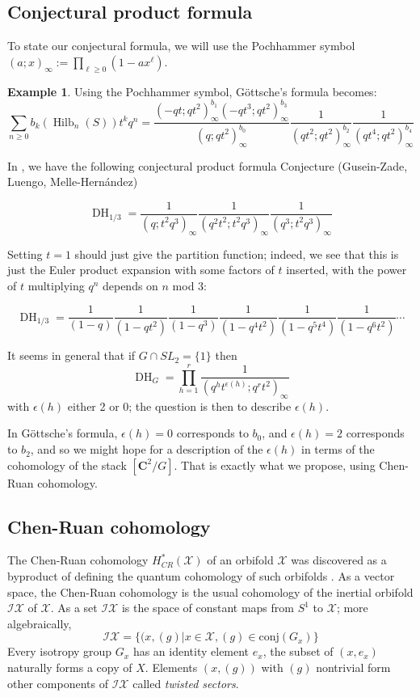 \documentclass{amsart}[12pt]
\theoremstyle{definition}
\newtheorem{example}[dummy]{Example}
\newcommand{\C}{\mathbf{C}}
\DeclareMathOperator{\Hilb}{Hilb}
\DeclareMathOperator{\DC}{DH}
\begin{document}
\subsection{Conjectural product formula}

To state our conjectural formula, we will use the Pochhammer symbol $(a;x)_\infty:=\prod_{\ell\geq 0} (1-ax^\ell)$.
\begin{example}
Using the Pochhammer symbol, G\"ottsche's formula becomes:
$$\sum_{n\geq 0} b_k(\Hilb_n(S))t^kq^n=\frac{(-qt;qt^2)_\infty^{b_1}(-qt^3;qt^2)_\infty^{b_3}}{(q;qt^2)_\infty^{b_0}}\frac{1}{(qt^2;qt^2)_\infty^{b_2}}\frac{1}{(qt^4;qt^2)_\infty^{b_4}}$$
\end{example}

In \cite{GLMequivariant}, we have the following conjectural product formula 
{Conjecture (Gusein-Zade, Luengo, Melle-Hern\'andez)}

$$\DC_{1/3}=\frac{1}{(q;t^2q^3)_\infty}\frac{1}{(q^2t^2;t^2q^3)_\infty}\frac{1}{(q^3;t^2q^3)_\infty}$$

Setting $t=1$ should just give the partition function; indeed, we see that this is just the Euler product expansion with some factors of $t$ inserted, with the power of $t$ multiplying $q^n$ depends on $n$ mod 3:

$$\DC_{1/3}=\frac{1}{(1-q)}\frac{1}{(1-qt^2)}\frac{1}{(1-q^3)}\frac{1}{(1-q^4t^2)}
\frac{1}{(1-q^5t^4)}\frac{1}{(1-q^6t^2)}\cdots$$

 It seems in general that if $G\cap SL_2=\{1\}$ then
$$\DC_{G}=\prod_{h=1}^r \frac{1}{(q^h t^{\epsilon(h)}; q^r t^2)_\infty}$$
with $\epsilon(h)$ either 2 or 0; the question is then to describe $\epsilon(h)$.

In G\"ottsche's formula, $\epsilon(h)=0$ corresponds to $b_0$, and $\epsilon(h)=2$ corresponds to $b_2$, and so we might hope for a description of the $\epsilon(h)$ in terms of the cohomology of the stack $[\C^2/G]$.  That is exactly what we propose, using Chen-Ruan cohomology.



\subsection{Chen-Ruan cohomology}

The Chen-Ruan cohomology $H_{CR}^*(\mathcal{X})$ of an orbifold $\mathcal{X}$ was discovered as a byproduct of defining the quantum cohomology of such orbifolds \cite{chenruancohomology}.  As a vector space, the Chen-Ruan cohomology is the usual cohomology of the inertial orbifold $\mathcal{IX}$ of $\mathcal{X}$.  As a set $\mathcal{IX}$ is the space of constant maps from $S^1$ to $\mathcal{X}$; more algebraically, 
$$\mathcal{IX}=\{(x, (g)| x\in \mathcal{X}, (g)\in\textrm{conj}(G_x)\}$$
Every isotropy group $G_x$ has an identity element $e_x$, the subset of $(x, e_x)$ naturally forms a copy of $X$.  Elements $(x,(g))$ with $(g)$ nontrivial form other components of $\mathcal{IX}$ called \emph{twisted sectors}.
\end{document}
